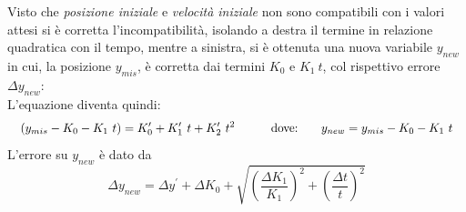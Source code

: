 \documentclass[12pt, a4paper]{article}
\begin{document}
    \bigskip
Visto che \textit{posizione iniziale} e \textit{velocità iniziale} non sono compatibili con i valori attesi si è corretta l'incompatibilità, isolando a destra il termine in relazione  quadratica con il tempo, mentre a sinistra, si è ottenuta una nuova variabile $y_{new}$ in cui, la posizione $y_{mis}$, è corretta dai termini $K_0$ e $ K_1\ t$, col rispettivo errore $\Delta y_{new}$: \\
L'equazione diventa quindi:
\begin{equation*}
\begin{aligned}
  & & (y_{mis} - K_0 - K_1\ t) = K_0'+K_1'\ t+K_{2}'\ t^2
  &\quad{} 
  \end{aligned}
  \begin{aligned}
  & &\text{dove:\phantom{.......}} y_{new} = y_{mis} - K_0 - K_1\ t 
  &
  \end{aligned}
\end{equation*}
L'errore su  $y_{new}$ è dato da
\begin{equation*}
 \Delta y_{new} = \Delta y^{'} + \Delta K_0 + \sqrt{\left(\frac{\Delta K_1}{K_1}\right)^2 + \left(\frac{\Delta t}{t}\right)^2}
 \end{equation*}
\\
\\
\\
\end{document}
